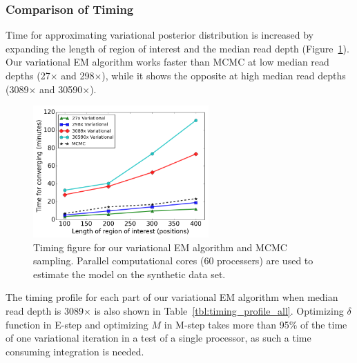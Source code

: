 \documentclass[11pt,reqno]{amsart}
\begin{document}
\subsubsection{Comparison of Timing}
Time for approximating variational posterior distribution is increased by expanding the length of region of interest and the median read depth (Figure~\ref{tbl:timing_mcmc_var}).
Our variational EM algorithm works faster than MCMC at low median read depths (27$\times$ and 298$\times$), while it shows the opposite at high median read depths (3089$\times$ and 30590$\times$).
\begin{figure}[h]
\centering
\includegraphics[width=0.6\textwidth]{figs/timing_var_mcmc.png}
\caption{Timing figure for our variational EM algorithm and MCMC sampling.
Parallel computational cores (60 processers) are used to estimate the model on the synthetic data set.}
\label{tbl:timing_mcmc_var}
\end{figure}
The timing profile for each part of our variational EM algorithm when median read depth is 3089$\times$ is also shown in Table~\ref{tbl:timing_profile_all}.
Optimizing $\delta$ function in E-step and optimizing $M$ in M-step takes more than 95\% of the time of one variational iteration in a test of a single processor, as such a time consuming integration is needed.
\end{document}
